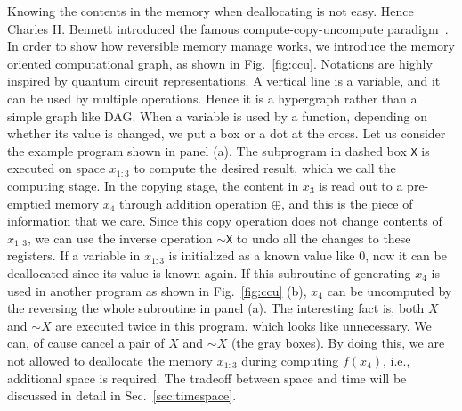 \documentclass[aps,twocolumn,longbibliography,english,superscriptaddress]{revtex4-1}
\newcommand{\<}{\langle}
\renewcommand{\>}{\rangle}
\newcommand{\Fig}[1]{Fig.~\ref{#1}}
\newcommand{\Sec}[1]{Sec.~\ref{#1}}
\theoremstyle{definition}\newtheorem{definition}{\textit{Definition}}
\begin{document}
Knowing the contents in the memory when deallocating is not easy. Hence Charles H. Bennett introduced the famous compute-copy-uncompute paradigm~\cite{Bennett1973}.
In order to show how reversible memory manage works, we introduce the memory oriented computational graph, as shown in \Fig{fig:ccu}.
Notations are highly inspired by quantum circuit representations. A vertical line is a variable, and it can be used by multiple operations. Hence it is a hypergraph rather than a simple graph like DAG. When a variable is used by a function, depending on whether its value is changed, we put a box or a dot at the cross.
Let us consider the example program shown in panel (a). The subprogram in dashed box \texttt{X} is executed on space $x_{1\colon3}$ to compute the desired result, which we call the computing stage. In the copying stage, the content in $x_3$ is read out to a pre-emptied memory $x_4$ through addition operation $\oplus$, and this is the piece of information that we care.
Since this copy operation does not change contents of $x_{1\colon3}$, we can use the inverse operation \texttt{$\sim$X} to undo all the changes to these registers. If a variable in $x_{1\colon3}$ is initialized as a known value like $0$, now it can be deallocated since its value is known again.
If this subroutine of generating $x_4$ is used in another program as shown in \Fig{fig:ccu} (b), $x_4$ can be uncomputed by the reversing the whole subroutine in panel (a).
The interesting fact is, both $X$ and $\sim X$ are executed twice in this program, which looks like unnecessary. We can, of cause cancel a pair of $X$ and $\sim X$ (the gray boxes). By doing this, we are not allowed to deallocate the memory $x_{1\colon3}$ during computing $f(x_4)$, i.e., additional space is required. The tradeoff between space and time will be discussed in detail in \Sec{sec:timespace}.
\end{document}
